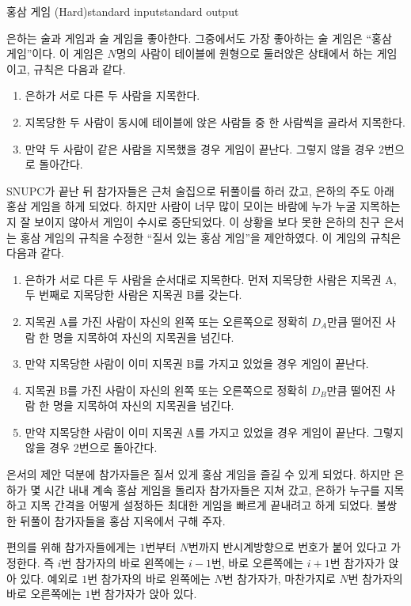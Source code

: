 \begin{problem}{홍삼 게임 (Hard)}{standard input}{standard output}

은하는 술과 게임과 술 게임을 좋아한다. 그중에서도 가장 좋아하는 술 게임은 ``홍삼 게임''이다. 이 게임은 $N$명의 사람이 테이블에 원형으로 둘러앉은 상태에서 하는 게임이고, 규칙은 다음과 같다.

\begin{enumerate}
\item{은하가 서로 다른 두 사람을 지목한다.}
\item{지목당한 두 사람이 동시에 테이블에 앉은 사람들 중 한 사람씩을 골라서 지목한다.}
\item{만약 두 사람이 같은 사람을 지목했을 경우 게임이 끝난다. 그렇지 않을 경우 2번으로 돌아간다.}
\end{enumerate}

SNUPC가 끝난 뒤 참가자들은 근처 술집으로 뒤풀이를 하러 갔고, 은하의 주도 아래 홍삼 게임을 하게 되었다. 하지만 사람이 너무 많이 모이는 바람에 누가 누굴 지목하는지 잘 보이지 않아서 게임이 수시로 중단되었다. 이 상황을 보다 못한 은하의 친구 은서는 홍삼 게임의 규칙을 수정한 ``질서 있는 홍삼 게임''을 제안하였다. 이 게임의 규칙은 다음과 같다.

\begin{enumerate}
\item{은하가 서로 다른 두 사람을 순서대로 지목한다. 먼저 지목당한 사람은 지목권 A, 두 번째로 지목당한 사람은 지목권 B를 갖는다.}
\item{지목권 A를 가진 사람이 자신의 왼쪽 또는 오른쪽으로 정확히 $D_{A}$만큼 떨어진 사람 한 명을 지목하여 자신의 지목권을 넘긴다.}
\item{만약 지목당한 사람이 이미 지목권 B를 가지고 있었을 경우 게임이 끝난다.}
\item{지목권 B를 가진 사람이 자신의 왼쪽 또는 오른쪽으로 정확히 $D_{B}$만큼 떨어진 사람 한 명을 지목하여 자신의 지목권을 넘긴다.}
\item{만약 지목당한 사람이 이미 지목권 A를 가지고 있었을 경우 게임이 끝난다. 그렇지 않을 경우 2번으로 돌아간다.}
\end{enumerate}

은서의 제안 덕분에 참가자들은 질서 있게 홍삼 게임을 즐길 수 있게 되었다. 하지만 은하가 몇 시간 내내 계속 홍삼 게임을 돌리자 참가자들은 지쳐 갔고, 은하가 누구를 지목하고 지목 간격을 어떻게 설정하든 최대한 게임을 빠르게 끝내려고 하게 되었다. 불쌍한 뒤풀이 참가자들을 홍삼 지옥에서 구해 주자.

편의를 위해 참가자들에게는 $1$번부터 $N$번까지 반시계방향으로 번호가 붙어 있다고 가정한다. 즉 $i$번 참가자의 바로 왼쪽에는 $i-1$번, 바로 오른쪽에는 $i+1$번 참가자가 앉아 있다. 예외로 $1$번 참가자의 바로 왼쪽에는 $N$번 참가자가, 마찬가지로 $N$번 참가자의 바로 오른쪽에는 $1$번 참가자가 앉아 있다.


\end{problem}
